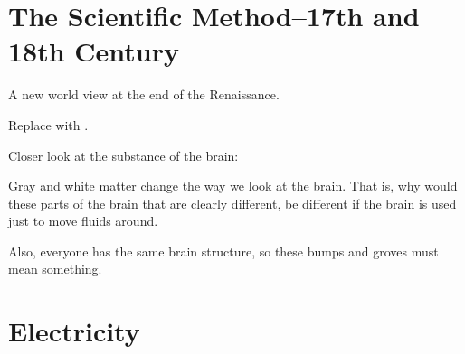 \section{The Scientific Method--17th and 18th Century}

\begin{coloredlist}
    \item A new world view at the end of the Renaissance.
    \begin{coloredlist}
        \item Replace  with .
    \end{coloredlist}
    \item Closer look at the substance of the brain:
    \begin{coloredlist}
        \item Gray and white matter change the way we look at the brain. That is, why would these parts of the brain that are clearly different, be different if the brain is used just to move fluids around.
        \item Also, everyone has the same brain structure, so these bumps and groves must mean something.
    \end{coloredlist}
\end{coloredlist}

\section{Electricity}

